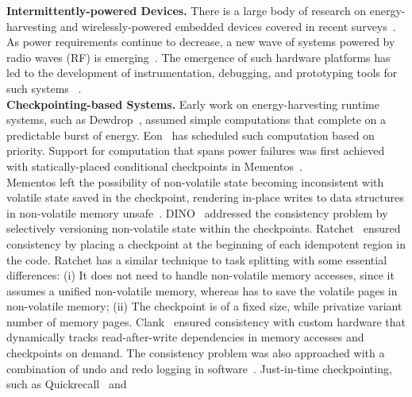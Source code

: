 \textbf{Intermittently-powered Devices.} There is a large body of research on
energy-harvesting and wirelessly-powered embedded devices covered in recent
surveys~\cite{prasad_comst_2014,sample_procieee_2013,huang:commag:2015,visser_procieee_2013,kamalinejad_commag_2015,ku_cst_2016}.
As power requirements continue to decrease, a new wave of
systems powered by radio waves (RF) is
emerging~\cite{patel_pervasive_2017,rf_powered_computing_gollakota_2014,wisp5,moo,zhao_rfid_2015,holleman_biocas_2008,thomas_jbcs_2012,naderiparizi_rfid_2015,rodriguez_tbcs_2015,liu_sigcomm_2013,kicksat,nadeau_naturebio_2017}.
The emergence of such hardware platforms
has led to the development of instrumentation, debugging, and prototyping tools
for such systems
~\cite{hester_sensys_2014,hester_sensys_2015,edb,capybara,stork,wisent,flicker}. \\
%
\textbf{Checkpointing-based Systems.} Early work on energy-harvesting runtime
systems, such as Dewdrop~\cite{dewdrop}, assumed simple computations
that complete on a predictable burst of energy.
Eon~\cite{sorber_sensys_2007} has scheduled such computation based on priority.
Support for computation that spans power failures was first achieved with
statically-placed conditional checkpoints in Mementos~\cite{mementos}. \\
%
Mementos left the possibility of non-volatile state becoming inconsistent with
volatile state saved in the checkpoint, rendering in-place writes to data
structures in non-volatile memory unsafe~\cite{mspcdino}.
%
DINO~\cite{dino} addressed the consistency problem by selectively versioning
non-volatile state within the checkpoints. Ratchet~\cite{ratchet} ensured
consistency by placing a checkpoint at the beginning of each idempotent region
in the code. Ratchet has a similar technique to task splitting with some essential differences: (i) It does not need to handle non-volatile memory accesses, since it assumes a unified non-volatile memory, whereas \sys has to save the volatile pages in non-volatile memory; (ii) The checkpoint is of a fixed size, while \sys privatize variant number of memory pages.  Clank~\cite{hicks_isca_2017} ensured consistency with custom
hardware that dynamically tracks read-after-write dependencies in memory
accesses and checkpoints on demand. The consistency problem was also
approached with a combination of undo and redo logging in
software~\cite{baghsorkhi_cgo_2018}.
%
Just-in-time checkpointing, such as Quickrecall~\cite{quickrecall} and
